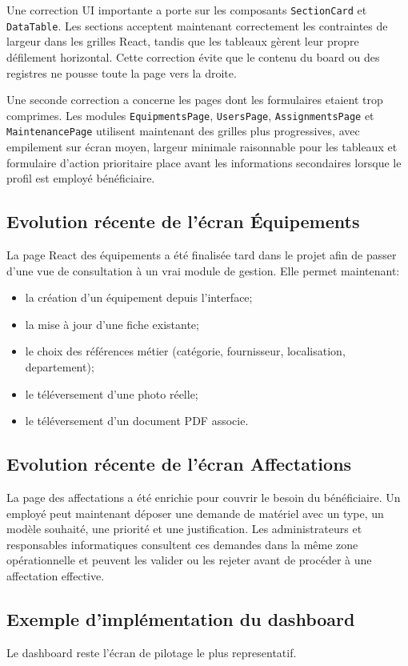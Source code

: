 ﻿\documentclass[12pt,a4paper,oneside]{report}
\begin{document}
Une correction UI importante a porte sur les composants \texttt{SectionCard} et \texttt{DataTable}. Les sections acceptent maintenant correctement les contraintes de largeur dans les grilles React, tandis que les tableaux gèrent leur propre défilement horizontal. Cette correction évite que le contenu du board ou des registres ne pousse toute la page vers la droite.

Une seconde correction a concerne les pages dont les formulaires etaient trop comprimes. Les modules \texttt{EquipmentsPage}, \texttt{UsersPage}, \texttt{AssignmentsPage} et \texttt{MaintenancePage} utilisent maintenant des grilles plus progressives, avec empilement sur écran moyen, largeur minimale raisonnable pour les tableaux et formulaire d'action prioritaire place avant les informations secondaires lorsque le profil est employé bénéficiaire.

\subsection{Evolution récente de l'écran Équipements}
La page React des équipements a été finalisée tard dans le projet afin de passer d'une vue de consultation à un vrai module de gestion. Elle permet maintenant:
\begin{itemize}
  \item la création d'un équipement depuis l'interface;
  \item la mise à jour d'une fiche existante;
  \item le choix des références métier (catégorie, fournisseur, localisation, departement);
  \item le téléversement d'une photo réelle;
  \item le téléversement d'un document PDF associe.
\end{itemize}

\subsection{Evolution récente de l'écran Affectations}
La page des affectations a été enrichie pour couvrir le besoin du bénéficiaire. Un employé peut maintenant déposer une demande de matériel avec un type, un modèle souhaité, une priorité et une justification. Les administrateurs et responsables informatiques consultent ces demandes dans la même zone opérationnelle et peuvent les valider ou les rejeter avant de procéder à une affectation effective.

\subsection{Exemple d'implémentation du dashboard}
Le dashboard reste l'écran de pilotage le plus representatif.
\end{document}
